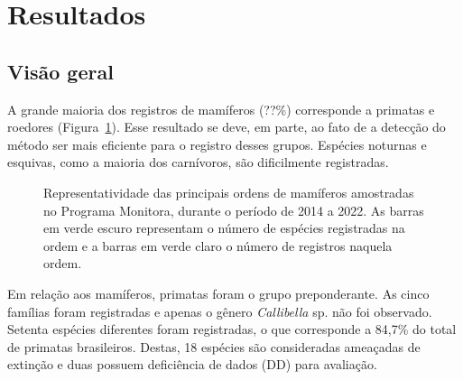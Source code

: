 \documentclass[
  letterpaper,
]{scrbook}
\begin{document}
\section{Resultados}\label{resultados-2}

\subsection{Visão geral}\label{visuxe3o-geral}

A grande maioria dos registros de mamíferos (??\%) corresponde a
primatas e roedores (Figura~\ref{fig-registros-ordem}). Esse resultado
se deve, em parte, ao fato de a detecção do método ser mais eficiente
para o registro desses grupos. Espécies noturnas e esquivas, como a
maioria dos carnívoros, são dificilmente registradas.

\begin{figure}[H]


\caption{\label{fig-registros-ordem}Representatividade das principais
ordens de mamíferos amostradas no Programa Monitora, durante o período
de 2014 a 2022. As barras em verde escuro representam o número de
espécies registradas na ordem e a barras em verde claro o número de
registros naquela ordem.}

\end{figure}%

Em relação aos mamíferos, primatas foram o grupo preponderante. As cinco
famílias foram registradas e apenas o gênero \emph{Callibella} sp. não
foi observado. Setenta espécies diferentes foram registradas, o que
corresponde a 84,7\% do total de primatas brasileiros. Destas, 18
espécies são consideradas ameaçadas de extinção e duas possuem
deficiência de dados (DD) para avaliação.
\end{document}
